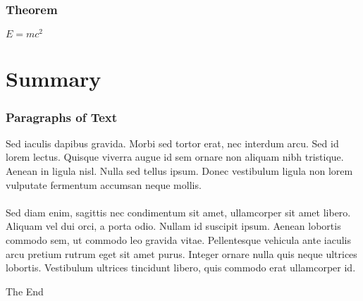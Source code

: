 \documentclass{beamer}
\begin{document}

\begin{frame}
\frametitle{Theorem}
\begin{theorem}
$E = mc^2$
\end{theorem}
\end{frame}


\section{Summary} %
\begin{frame}
\frametitle{Paragraphs of Text}
Sed iaculis dapibus gravida. Morbi sed tortor erat, nec interdum arcu. Sed id lorem lectus. Quisque viverra augue id sem ornare non aliquam nibh tristique. Aenean in ligula nisl. Nulla sed tellus ipsum. Donec vestibulum ligula non lorem vulputate fermentum accumsan neque mollis.\\~\\

Sed diam enim, sagittis nec condimentum sit amet, ullamcorper sit amet libero. Aliquam vel dui orci, a porta odio. Nullam id suscipit ipsum. Aenean lobortis commodo sem, ut commodo leo gravida vitae. Pellentesque vehicula ante iaculis arcu pretium rutrum eget sit amet purus. Integer ornare nulla quis neque ultrices lobortis. Vestibulum ultrices tincidunt libero, quis commodo erat ullamcorper id.
\end{frame}


\begin{frame}
\Huge{\centerline{The End}}
\end{frame}

\end{document}
